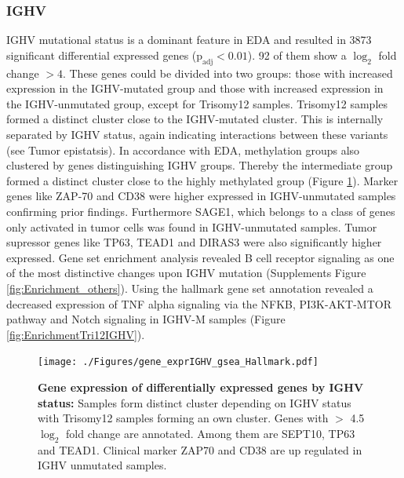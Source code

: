 \subsubsection{IGHV}
IGHV mutational status is a dominant feature in EDA and resulted in 3873 significant differential expressed genes ($\text{p}_\text{adj} < 0.01$). 92 of them show a $\log_2$ fold change $>4$. These genes could be divided into two groups: those with increased expression in the IGHV-mutated group and those with increased expression in the IGHV-unmutated group, except for Trisomy12 samples. Trisomy12 samples formed a distinct cluster close to the IGHV-mutated cluster. This is internally separated by IGHV status, again indicating interactions between these variants (see Tumor epistatsis). 
In accordance with EDA, methylation groups also clustered by genes distinguishing IGHV groups. Thereby the intermediate group formed a distinct cluster close to the highly methylated group (Figure \ref{fig:gene_exprIGHV_gsea_hallmark}). Marker genes like ZAP-70 and CD38 were higher expressed in IGHV-unmutated samples confirming prior findings. Furthermore SAGE1, which belongs to a class of genes only activated in tumor cells was found in IGHV-unmutated samples. Tumor supressor genes like TP63, TEAD1 and DIRAS3 were also significantly higher expressed. Gene set enrichment analysis revealed B cell receptor signaling as one of the most distinctive changes upon IGHV mutation (Supplements Figure \ref{fig:Enrichment_others}). Using the hallmark gene set annotation revealed a decreased expression of TNF alpha signaling via the NFKB, PI3K-AKT-MTOR pathway and Notch signaling in IGHV-M samples (Figure \ref{fig:EnrichmentTri12IGHV}).  

\FloatBarrier

\begin{figure}
	\centering
	\texttt{[image: ./Figures/gene\_exprIGHV\_gsea\_Hallmark.pdf]}
	\caption{\textbf{Gene expression of differentially expressed genes by IGHV status:} Samples form distinct cluster depending on IGHV status with Trisomy12 samples forming an own cluster. Genes with $>$ 4.5 $\log_2$ fold change are annotated. Among them are SEPT10, TP63 and TEAD1. Clinical marker ZAP70 and CD38 are up regulated in IGHV unmutated samples.}
	\label{fig:gene_exprIGHV_gsea_hallmark}
\end{figure}


\FloatBarrier

